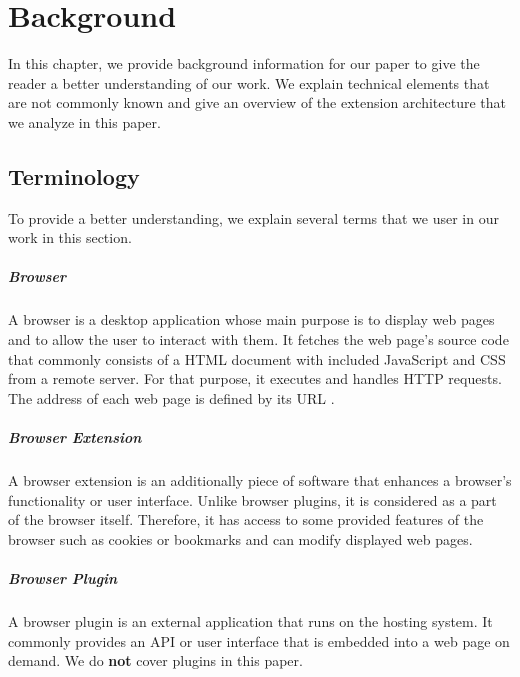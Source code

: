 
\chapter{Background}

	In this chapter, we provide background information for our paper to give the reader a better understanding of our work. We explain technical elements that are not commonly known and give an overview of the extension architecture that we analyze in this paper.

\section{Terminology}

	To provide a better understanding, we explain several terms that we user in our work in this section.

\paragraph{Browser}

	A browser is a desktop application whose main purpose is to display web pages and to allow the user to interact with them. It fetches the web page's source code that commonly consists of a HTML document with included JavaScript and CSS from a remote server. For that purpose, it executes and handles HTTP requests. The address of each web page is defined by its URL \cite{w3cUrlSpecifications}.
	
\paragraph{Browser Extension}
	
	A browser extension is an additionally piece of software that enhances a browser's functionality or user interface. Unlike browser plugins, it is considered as a part of the browser itself. Therefore, it has access to some provided features of the browser such as cookies or bookmarks and can modify displayed web pages. 
	
\paragraph{Browser Plugin}

	A browser plugin is an external application that runs on the hosting system. It commonly provides an API or user interface that is embedded into a web page on demand. We do \textbf{not} cover plugins in this paper.

